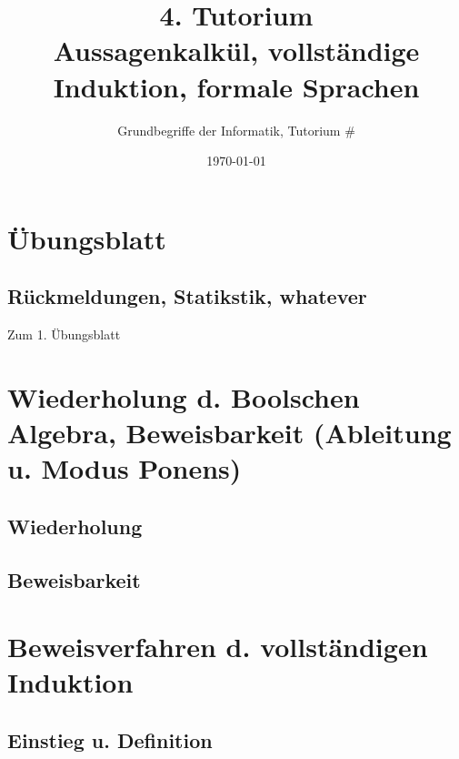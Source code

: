 



\title[Aussagenkalkül, vollständige Induktion, formale Sprachen]{4. Tutorium\\ Aussagenkalkül, vollständige Induktion, formale Sprachen}
\subtitle{Grundbegriffe der Informatik, Tutorium \#\mytutnumber}
\date{\today}


\titleframe
\roadmap

\section*{Übungsblatt}
\subsection{Rückmeldungen, Statikstik, whatever}
	\begin{frame}{Zum 1. Übungsblatt}
	    \begin{itemize}
	    \end{itemize}
	\end{frame}

\section[Boolsche Algebra]{Wiederholung d. Boolschen Algebra, Beweisbarkeit (Ableitung u. Modus Ponens)}
\subsection{Wiederholung}
\subsection{Beweisbarkeit}

\section[Vollständige Induktion]{Beweisverfahren d. vollständigen Induktion}
\subsection{Einstieg u. Definition}
